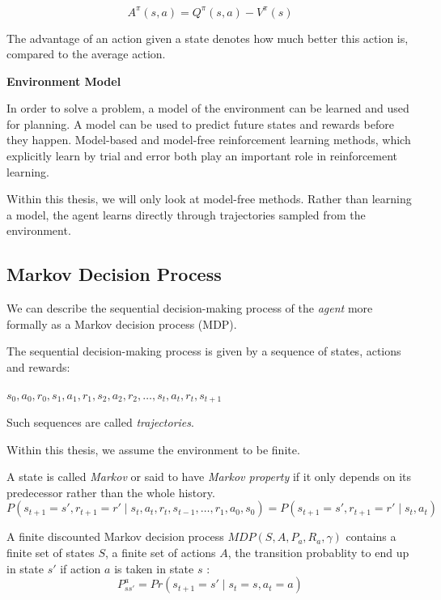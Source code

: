 \begin{equation}
A^\pi(s,a) = Q^\pi(s,a)-V^\pi(s)
\label{adv}
\end{equation}

The advantage of an action given a state denotes how much better this action is, compared to the average action.
\pagebreak

\textbf{Environment Model}

In order to solve a problem, a model of the environment can be learned and used for planning. A model can be used to predict future states and rewards before they happen.
Model-based and model-free reinforcement learning methods, which explicitly learn by trial and error both play an important role in reinforcement learning.

Within this thesis, we will only look at model-free methods. Rather than learning a model, the agent learns directly through trajectories sampled from the environment.

\pagebreak

\subsection{Markov Decision Process} 

We can describe the sequential decision-making process of the \textit{agent} more formally as a Markov decision process (MDP).

The sequential decision-making process is given by a sequence of states, actions and rewards:

$s_0, a_0, r_0, s_1, a_1, r_1, s_2, a_2, r_2, \dots, s_t,a_t,r_t, s_{t+1}$

Such sequences are called \textit{trajectories}.

Within this thesis, we assume the environment to be finite.

A state is called \textit{Markov} or said to have \textit{Markov property} if it only depends on its predecessor rather than the whole history.
\begin{equation}
P(s_{t+1} = s', r_{t+1} = r' \mid s_t, a_t, r_t, s_{t-1}, \dots ,r_1,a_0,s_0) = P(s_{t+1} = s', r_{t+1} = r' \mid s_t,a_t)
\end{equation}

A finite discounted Markov decision process $MDP(S,A,P_a,R_a,\gamma)$ contains a finite set of states $S$, 
a finite set of actions $A$,
the transition probablity to end up in state $s'$ if action $a$ is taken in state $s$ : 
\begin{equation}
P^a_{s s'} = Pr(s_{t+1} = s' \mid s_t = s, a_t = a)
\end{equation}

